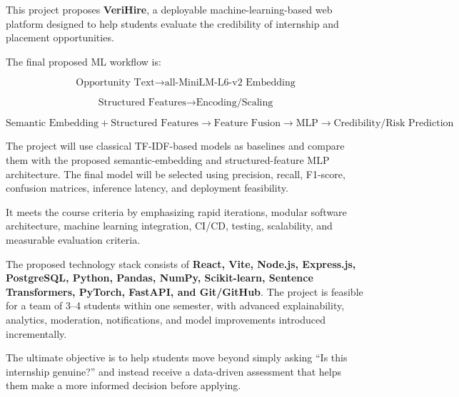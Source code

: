 \documentclass[11pt,a4paper]{article}
\begin{document}
This project proposes \textbf{VeriHire}, a deployable machine-learning-based
web platform designed to help students evaluate the credibility of
internship and placement opportunities.

The final proposed ML workflow is:

\[
\text{Opportunity Text}
\rightarrow
\text{all-MiniLM-L6-v2 Embedding}
\]

\[
\text{Structured Features}
\rightarrow
\text{Encoding/Scaling}
\]

\[
\text{Semantic Embedding}
+
\text{Structured Features}
\rightarrow
\text{Feature Fusion}
\rightarrow
\text{MLP}
\rightarrow
\text{Credibility/Risk Prediction}
\]

The project will use classical TF-IDF-based models as baselines and compare
them with the proposed semantic-embedding and structured-feature MLP
architecture. The final model will be selected using precision, recall,
F1-score, confusion matrices, inference latency, and deployment feasibility.

It meets the course criteria by emphasizing rapid iterations, modular
software architecture, machine learning integration, CI/CD, testing,
scalability, and measurable evaluation criteria.

The proposed technology stack consists of \textbf{React, Vite, Node.js,
Express.js, PostgreSQL, Python, Pandas, NumPy, Scikit-learn, Sentence
Transformers, PyTorch, FastAPI, and Git/GitHub}. The project is feasible for
a team of 3--4 students within one semester, with advanced explainability,
analytics, moderation, notifications, and model improvements introduced
incrementally.

The ultimate objective is to help students move beyond simply asking
``Is this internship genuine?'' and instead receive a data-driven
assessment that helps them make a more informed decision before applying.
\end{document}

